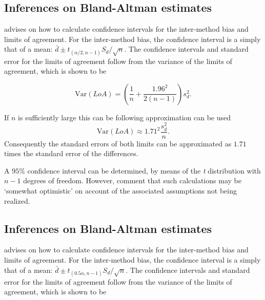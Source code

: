 \documentclass[Main.tex]{subfiles}
\begin{document}

\subsection{Inferences on Bland-Altman estimates}
\citet*{BA99} advises on how to calculate confidence intervals for the inter-method bias and limits of agreement.
For the inter-method bias, the confidence interval is a simply that of a mean: $\bar{d} \pm t_{(\alpha/2,n-1)} S_{d}/\sqrt{n}$.
The confidence
intervals and standard error for the limits of agreement follow from the variance of the limits of agreement, which is shown to be

\[
\mbox{Var}(LoA) = (\frac{1}{n}+\frac{1.96^{2}}{2(n-1)})s_{d}^{2}.
\]

If $n$ is sufficiently large this can be following approximation
can be used
\[
\mbox{Var}(LoA) \approx 1.71^{2}\frac{s_{d}^{2}}{n}.
\]
Consequently the standard errors of both limits can be
approximated as $1.71$ times the standard error of the
differences.

A $95\%$ confidence interval can be determined, by means of the
\emph{t} distribution with $n-1$ degrees of freedom. However, \citet*{BA99} comment that such calculations  may be `somewhat optimistic' on account of the associated assumptions not being realized.


	\subsection{Inferences on Bland-Altman estimates}
	\citet*{BA99}advises on how to calculate confidence intervals for the inter-method bias and limits of agreement.
	For the inter-method bias, the confidence interval is a simply that of a mean: $\bar{d} \pm t_{(0.5\alpha,n-1)} S_{d}/\sqrt{n}$.
	The confidence
	intervals and standard error for the limits of agreement follow from the variance of the limits of agreement, which is shown to be
	
\end{document}
